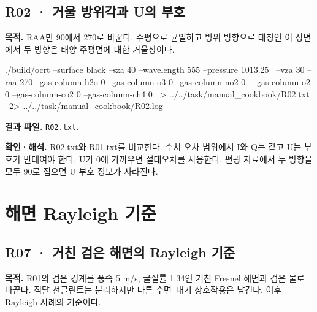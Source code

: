 \clearpage

\subsection{R02 · 거울 방위각과 U의 부호}
\label{sec:auto:09_cookbook:2.2}

\label{recipe:R02}

\textbf{목적. }RAA만 90\textdegree{}에서 270\textdegree{}로 바꾼다. 수평으로 균일하고 방위 방향으로 대칭인 이 장면에서 두 방향은 태양 주평면에 대한 거울상이다.

\noindent\begin{minipage}{\linewidth}
\begin{ManualCode}

./build/ocrt --surface black --sza 40 --wavelength 555 --pressure 1013.25 \
  --vza 30 --raa 270 --gas-column-h2o 0 --gas-column-o3 0 --gas-column-no2 0 \
  --gas-column-o2 0 --gas-column-co2 0 --gas-column-ch4 0 \
  > ../../task/manual_cookbook/R02.txt \
  2> ../../task/manual_cookbook/R02.log

\end{ManualCode}
\end{minipage}\par

\textbf{결과 파일. }\texttt{R02.txt}.

\textbf{확인·해석. }R02.txt와 R01.txt를 비교한다. 수치 오차 범위에서 I와 Q는 같고 U는 부호가 반대여야 한다. U가 0에 가까우면 절대오차를 사용한다. 편광 자료에서 두 방향을 모두 90\textdegree{}로 접으면 U 부호 정보가 사라진다.

\clearpage

\section{해면 Rayleigh 기준}

\label{sec:auto:09_cookbook:3}

\label{sec:cookbook_group:rayleigh}

\subsection{R07 · 거친 검은 해면의 Rayleigh 기준}
\label{sec:auto:09_cookbook:3.1}

\label{recipe:R07}

\textbf{목적. }R01의 검은 경계를 풍속 5 m/s, 굴절률 1.34인 거친 Fresnel 해면과 검은 물로 바꾼다. 직달 선글린트는 분리하지만 다른 수면–대기 상호작용은 남긴다. 이후 Rayleigh 사례의 기준이다.

